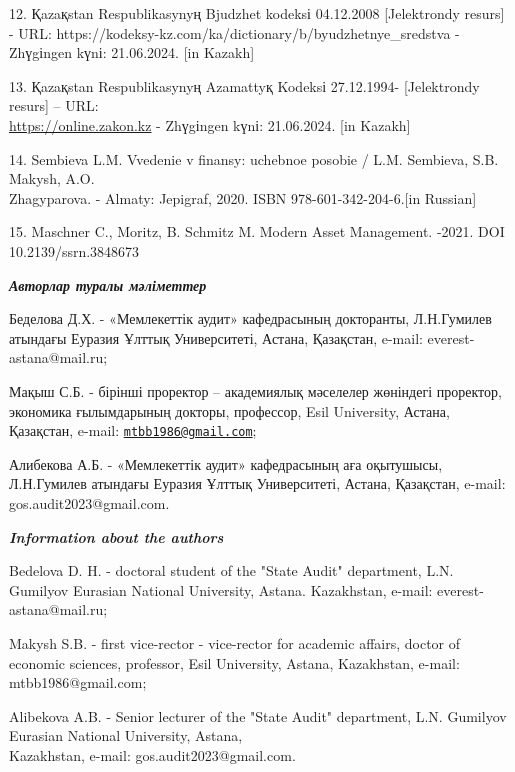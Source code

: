\begin{references}
12. Қazaқstan Respublikasynyң Bjudzhet kodeksі 04.12.2008 {[}Jelektrondy
resurs{]} - URL:
https://kodeksy-kz.com/ka/dictionary/b/byudzhetnye\_sredstva - Zhүgіngen
kүnі: 21.06.2024. {[}in Kazakh{]}

13. Қazaқstan Respublikasynyң Azamattyқ Kodeksі 27.12.1994-
{[}Jelektrondy resurs{]} -- URL:\\
\href{https://online.zakon.kz/Document/?doc\_id=51006061}{https://online.zakon.kz}
- Zhүgіngen kүnі: 21.06.2024. {[}in Kazakh{]}

14. Sembieva L.M. Vvedenie v finansy: uchebnoe posobie / L.M. Sembieva,
S.B. Makysh, A.O. \\Zhagyparova. - Almaty: Jepigraf, 2020. ISBN
978-601-342-204-6.{[}in Russian{]}

15. Maschner C., Moritz, B. Schmitz M. Modern Asset Management. -2021.
DOI 10.2139/ssrn.3848673
\end{references}

\begin{authorinfo}
\emph{{\bfseries Авторлар туралы мәліметтер}}

Беделова Д.Х. - «Мемлекеттік аудит» кафедрасының докторанты, Л.Н.Гумилев
атындағы Еуразия Ұлттық Университеті, Астана, Қазақстан, e-mail:
everest-astana@mail.ru;

Мақыш С.Б. - бірінші проректор -- академиялық мәселелер жөніндегі
проректор, экономика ғылымдарының докторы, профессор, Esil University,
Астана, Қазақстан, e-mail:
\href{mailto:mtbb1986@gmail.com}{\nolinkurl{mtbb1986@gmail.com}};

Алибекова А.Б. - «Мемлекеттік аудит» кафедрасының аға оқытушысы,
Л.Н.Гумилев атындағы Еуразия Ұлттық Университеті, Астана, Қазақстан,
e-mail: gos.audit2023@gmail.com.

\emph{{\bfseries Information about the authors}}

Bedelova D. H. - doctoral student of the "State Audit" department, L.N.
Gumilyov Eurasian National University, Astana. Kazakhstan, e-mail:
everest-astana@mail.ru;

Makysh S.B. - first vice-rector - vice-rector for academic affairs,
doctor of economic sciences, professor, Esil University, Astana,
Kazakhstan, e-mail: mtbb1986@gmail.com;

Alibekova A.B. - Senior lecturer of the "State Audit" department, L.N.
Gumilyov Eurasian National University, Astana, \\Kazakhstan, e-mail:
gos.audit2023@gmail.com.
\end{authorinfo}
